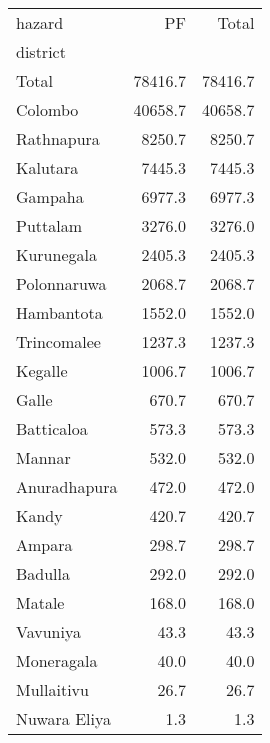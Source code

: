 \begin{tabular}{lrr}
\toprule
hazard &       PF &    Total \\
district     &          &          \\
\midrule
Total        &  78416.7 &  78416.7 \\
Colombo      &  40658.7 &  40658.7 \\
Rathnapura   &   8250.7 &   8250.7 \\
Kalutara     &   7445.3 &   7445.3 \\
Gampaha      &   6977.3 &   6977.3 \\
Puttalam     &   3276.0 &   3276.0 \\
Kurunegala   &   2405.3 &   2405.3 \\
Polonnaruwa  &   2068.7 &   2068.7 \\
Hambantota   &   1552.0 &   1552.0 \\
Trincomalee  &   1237.3 &   1237.3 \\
Kegalle      &   1006.7 &   1006.7 \\
Galle        &    670.7 &    670.7 \\
Batticaloa   &    573.3 &    573.3 \\
Mannar       &    532.0 &    532.0 \\
Anuradhapura &    472.0 &    472.0 \\
Kandy        &    420.7 &    420.7 \\
Ampara       &    298.7 &    298.7 \\
Badulla      &    292.0 &    292.0 \\
Matale       &    168.0 &    168.0 \\
Vavuniya     &     43.3 &     43.3 \\
Moneragala   &     40.0 &     40.0 \\
Mullaitivu   &     26.7 &     26.7 \\
Nuwara Eliya &      1.3 &      1.3 \\
\bottomrule
\end{tabular}
